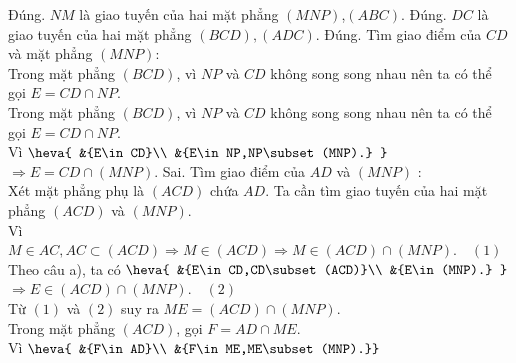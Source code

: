 \begin{ex}
{\begin{center}
\begin{tikzpicture}[x=0.75pt,y=0.75pt,yscale=-1,xscale=1]
\end{tikzpicture}
		\end{center}
		\begin{itemchoice}
			\itemch Đúng. $NM$ là giao tuyến của hai mặt phẳng $\left(MNP\right)$,$ (ABC)$.
			\itemch Đúng. $DC$ là giao tuyến của hai mặt phẳng $\left(BCD\right),(ADC)$.
			\itemch Đúng. Tìm giao điểm của $ CD$ và mặt phẳng $ (MNP)$:\\
			Trong mặt phẳng $ (BCD)$, vì $ NP$ và $ CD$ không song song nhau nên ta có thể gọi $ E=CD\cap NP$.\\
			Trong mặt phẳng $ (BCD)$, vì $ NP$ và $ CD$ không song song nhau nên ta có thể gọi $ E=CD\cap NP$.\\
			Vì $\heva{
					&{E\in CD}\\
					&{E\in NP,NP\subset (MNP).}
				}$ \\
			$\Rightarrow E=CD\cap (MNP)$.
			\itemch Sai. Tìm giao điểm của $ AD$ và $ (MNP)$ :\\
			Xét mặt phẳng phụ là $ (ACD)$ chứa $ AD$. Ta cần tìm giao tuyến của hai mặt phẳng $ (ACD)$ và $ (MNP)$.\\
			Vì $ M\in AC,AC\subset (ACD)\Rightarrow M\in (ACD)\Rightarrow M\in (ACD)\cap (MNP).\quad(1)$\\
			Theo câu a), ta có $\heva{
					&{E\in CD,CD\subset (ACD)}\\
					&{E\in (MNP).}
			}$ \\
			$\Rightarrow E\in (ACD)\cap (MNP).\quad(2)$\\
			Từ $(1)$ và $(2)$ suy ra $ ME=(ACD)\cap (MNP)$.\\
			Trong mặt phẳng $ (ACD)$, gọi $ F=AD\cap ME$.\\
			Vì $\heva{
					&{F\in AD}\\
					&{F\in ME,ME\subset (MNP).}}$
		\end{itemchoice}
	}
\end{ex}

